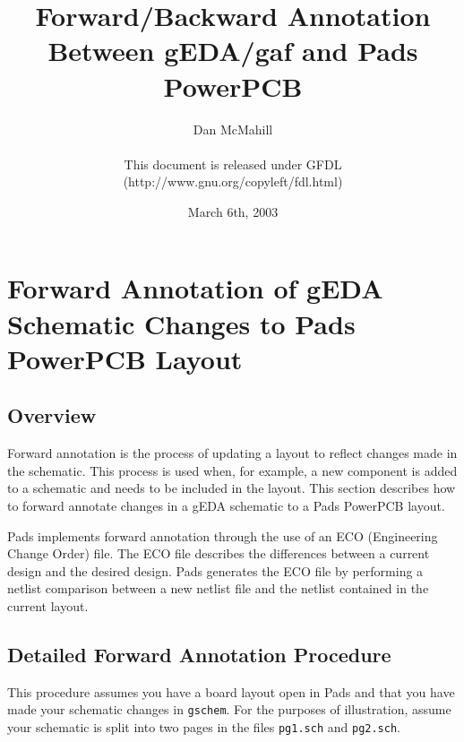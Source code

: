 \documentclass{article}
\title{Forward/Backward Annotation Between gEDA/gaf and Pads PowerPCB}
\author{Dan McMahill\\
        \\
        This document is released under GFDL\\ 
        (http://www.gnu.org/copyleft/fdl.html)}
\date{March 6th, 2003}
\begin{document}
\maketitle
\newpage

\tableofcontents
\newpage

\section{Forward Annotation of gEDA Schematic Changes to Pads PowerPCB Layout}
\subsection{Overview}
Forward annotation is the process of updating a layout to reflect
changes made in the schematic.  This process is used when, for
example, a new component is added to a schematic and needs to be
included in the layout.  This section describes how to forward
annotate changes in a gEDA schematic to a Pads PowerPCB layout.

Pads implements forward annotation through the use of an ECO
(Engineering Change Order) file.  The ECO file describes the
differences between a current design and the desired design.  Pads
generates the ECO file by performing a netlist comparison between a
new netlist file and the netlist contained in the current layout.

\subsection{Detailed Forward Annotation Procedure}
This procedure assumes you have a board layout open in Pads and that
you have made your schematic changes in {\tt gschem}.  For the
purposes of illustration, assume your schematic is split into two
pages in the files {\tt pg1.sch} and {\tt pg2.sch}.
\end{document}
